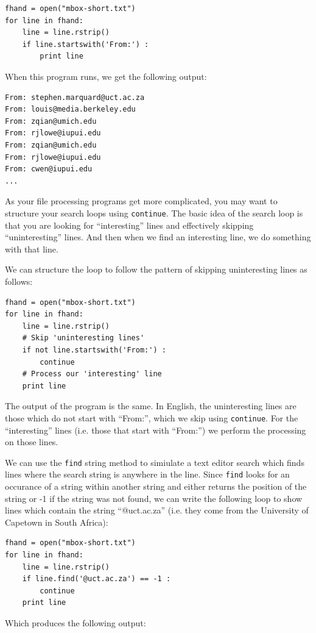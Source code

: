 \documentclass[10pt]{book}
\begin{document}
\beforeverb
\begin{verbatim}
fhand = open("mbox-short.txt")
for line in fhand:
    line = line.rstrip()
    if line.startswith('From:') :
        print line
\end{verbatim}
\afterverb
%
When this program runs, we get the following output:

\beforeverb
\begin{verbatim}
From: stephen.marquard@uct.ac.za
From: louis@media.berkeley.edu
From: zqian@umich.edu
From: rjlowe@iupui.edu
From: zqian@umich.edu
From: rjlowe@iupui.edu
From: cwen@iupui.edu
...
\end{verbatim}
\afterverb
%
As your file processing programs get more complicated, you may want 
to structure your search loops using {\tt continue}.  The basic idea 
of the search loop is that you are looking for ``interesting'' lines
and effectively skipping ``uninteresting'' lines.  And then when we
find an interesting line, we do something with that line.

We can structure the loop to follow the
pattern of skipping uninteresting lines as follows:

\beforeverb
\begin{verbatim}
fhand = open("mbox-short.txt")
for line in fhand:
    line = line.rstrip()
    # Skip 'uninteresting lines'
    if not line.startswith('From:') :
        continue
    # Process our 'interesting' line
    print line
\end{verbatim}
\afterverb
%
The output of the program is the same.  In English, the 
uninteresting lines are those which do not start 
with ``From:'', which we skip using {\tt continue}.
For the ``interesting'' lines (i.e. those that start with ``From:'')
we perform the processing on those lines.

We can use the {\tt find} string method to simiulate a text editor
search which finds lines where the search string is anywhere in the line.  
Since {\tt find} looks for an occurance of a string within another
string and either returns the position of the string or -1 if the string
was not found, we can write the following loop to show lines which
contain the string ``@uct.ac.za'' (i.e. they come from the University 
of Capetown in South Africa):

\beforeverb
\begin{verbatim}
fhand = open("mbox-short.txt")
for line in fhand:
    line = line.rstrip()
    if line.find('@uct.ac.za') == -1 : 
        continue
    print line
\end{verbatim}
\afterverb
%
Which produces the following output:
\end{document}
